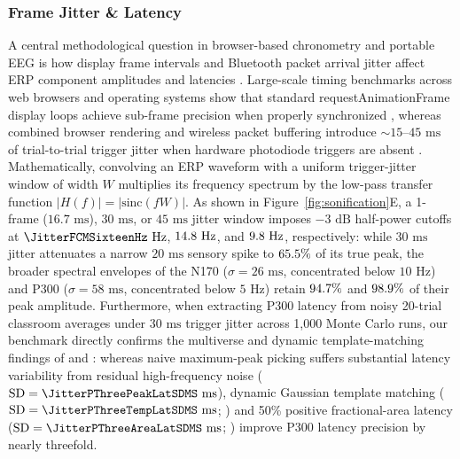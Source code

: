 \documentclass[11pt]{article}
\begin{document}
\subsubsection{Frame Jitter \& Latency}
A central methodological question in browser-based chronometry and portable EEG is how display frame intervals and Bluetooth packet arrival jitter affect ERP component amplitudes and latencies \citep{pronk2020mental,anwyl2021realistic,lukacs2023precise,schubert2024multiverse,schubert2026dynamic}. Large-scale timing benchmarks across web browsers and operating systems show that standard requestAnimationFrame display loops achieve sub-frame precision when properly synchronized \citep{pronk2020mental,lukacs2023precise}, whereas combined browser rendering and wireless packet buffering introduce $\sim 15\text{--}45\text{ ms}$ of trial-to-trial trigger jitter when hardware photodiode triggers are absent \citep{anwyl2021realistic,krigolson2017choosing}. Mathematically, convolving an ERP waveform with a uniform trigger-jitter window of width $W$ multiplies its frequency spectrum by the low-pass transfer function $|H(f)| = |\text{sinc}(fW)|$. As shown in Figure~\ref{fig:sonification}E, a 1-frame ($16.7\text{ ms}$), $30\text{ ms}$, or $45\text{ ms}$ jitter window imposes $-3\text{ dB}$ half-power cutoffs at $\JitterFCMSixteenHz\text{ Hz}$, $14.8\text{ Hz}$, and $9.8\text{ Hz}$, respectively: while $30\text{ ms}$ jitter attenuates a narrow $20\text{ ms}$ sensory spike to $65.5\%$ of its true peak, the broader spectral envelopes of the N170 ($\sigma = 26\text{ ms}$, concentrated below $10\text{ Hz}$) and P300 ($\sigma = 58\text{ ms}$, concentrated below $5\text{ Hz}$) retain $94.7\%$ and $98.9\%$ of their peak amplitude. Furthermore, when extracting P300 latency from noisy 20-trial classroom averages under $30\text{ ms}$ trigger jitter across 1,000 Monte Carlo runs, our benchmark directly confirms the multiverse and dynamic template-matching findings of \citet{schubert2024multiverse} and \citet{schubert2026dynamic}: whereas naive maximum-peak picking suffers substantial latency variability from residual high-frequency noise ($\text{SD} = \JitterPThreePeakLatSDMS\text{ ms}$), dynamic Gaussian template matching ($\text{SD} = \JitterPThreeTempLatSDMS\text{ ms}$; \citealp{schubert2026dynamic}) and 50\% positive fractional-area latency ($\text{SD} = \JitterPThreeAreaLatSDMS\text{ ms}$; \citealp{schubert2024multiverse}) improve P300 latency precision by nearly threefold.
\end{document}
